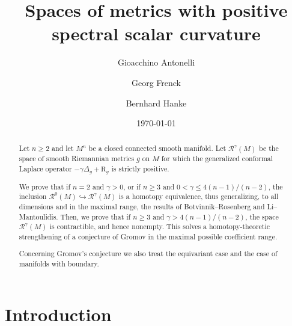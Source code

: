 \documentclass[11pt]{amsart}
\title{Spaces of metrics with positive spectral scalar curvature}
\author{Gioacchino Antonelli}
\author{Georg Frenck}
\author{Bernhard Hanke}
\date{\today}
\numberwithin{equation}{section}
\newcommand{\scal}{\mathrm{R}}
\let\ge\geqslant
\let\geq\geqslant
\let\leq\leqslant
\begin{document}
 
\begin{abstract}
Let $n\geq2$ and let $M^n$
be a closed connected smooth manifold. 
Let $\mathcal{R}^\gamma(M)$ be the space of smooth
Riemannian metrics $g$ on $M$ for which
the generalized conformal Laplace operator $-\gamma\Delta_g+\scal_g$ is strictly positive.

We prove that if $n=2$ and $\gamma>0$, or if $n\ge3$ and $0< \gamma \leq 4(n-1)/(n-2)$, the inclusion $\mathcal{R}^0(M)\hookrightarrow \mathcal{R}^\gamma(M)$ is a homotopy equivalence, thus generalizing, to all dimensions and in the maximal range, the results of Botvinnik--Rosenberg and Li--Mantoulidis.
Then, we prove that if $n\ge3$ and $\gamma>4(n-1)/(n-2)$, the space $\mathcal{R}^\gamma(M)$ is contractible, and hence nonempty.
This solves a homotopy-theoretic strengthening of a conjecture of Gromov \cite[Conjecture 3, Section 6.1.2]{GromovFourLectures} in the maximal possible coefficient range. 

Concerning Gromov's conjecture we also treat the equivariant case and the case of manifolds with boundary.
\end{abstract}
\maketitle

\tableofcontents 

\section{Introduction}
\end{document}
